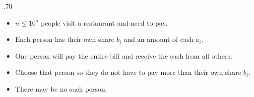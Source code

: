 \begin{frame}
    \frametitle{\problemtitle}

    \begin{columns}
        \begin{column}[T]{.70\textwidth}
            \begin{itemize}
                \item $n \leq 10^5$ people visit a restaurant and need to pay.
                \item Each person has their own share $b_i$ and an amount of cash $a_i$.
                \item One person will pay the entire bill and receive the cash from all others.
                \item Choose that person so they do not have to pay more than their own share $b_i$.
                \item There may be no such person.
            \end{itemize}


        \end{column}


    \end{columns}
\end{frame}
